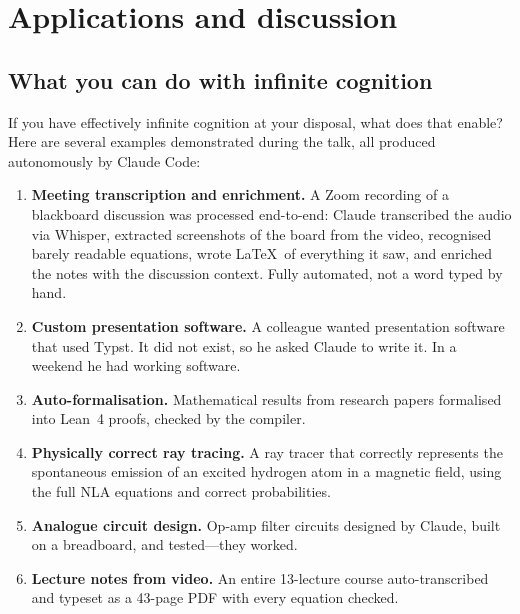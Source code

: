 
\section{Applications and discussion}\label{sec:applications}

\subsection{What you can do with infinite cognition}

If you have effectively infinite cognition at your disposal, what does
that enable?  Here are several examples demonstrated during the talk,
all produced autonomously by Claude Code:

\begin{enumerate}[(1)]
  \item \textbf{Meeting transcription and enrichment.}  A Zoom recording
    of a blackboard discussion was processed end-to-end: Claude
    transcribed the audio via Whisper, extracted screenshots of the
    board from the video, recognised barely readable equations, wrote
    \LaTeX\ of everything it saw, and enriched the notes with the
    discussion context.  Fully automated, not a word typed by hand.

  \item \textbf{Custom presentation software.}  A colleague wanted
    presentation software that used Typst.  It did not exist, so he
    asked Claude to write it.  In a weekend he had working software.

  \item \textbf{Auto-formalisation.}  Mathematical results from research
    papers formalised into Lean~4 proofs, checked by the compiler.

  \item \textbf{Physically correct ray tracing.}  A ray tracer that
    correctly represents the spontaneous emission of an excited hydrogen
    atom in a magnetic field, using the full NLA equations and correct
    probabilities.

  \item \textbf{Analogue circuit design.}  Op-amp filter circuits
    designed by Claude, built on a breadboard, and tested---they worked.

  \item \textbf{Lecture notes from video.}  An entire 13-lecture course
    auto-transcribed and typeset as a 43-page PDF with every equation
    checked.
\end{enumerate}


